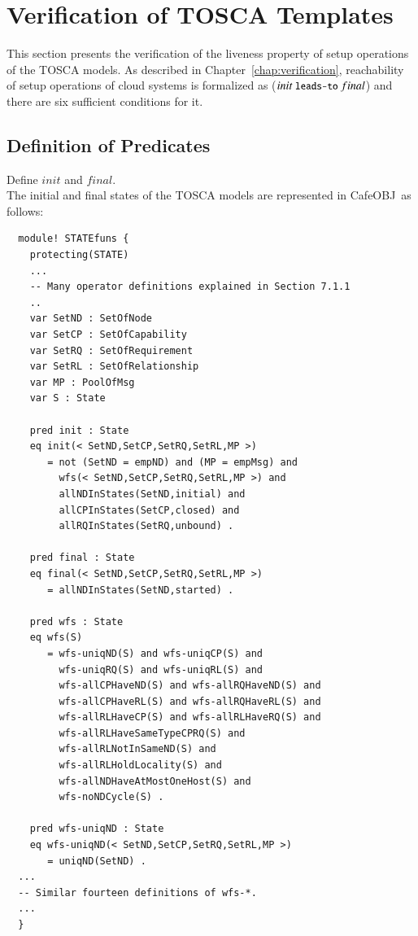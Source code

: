 \documentclass[12pt]{report}
\newcommand{\mbstt}[1]{\mbox{\small{\tt {#1}}}}
\newcommand{\cafeobj}{{\sf CafeOBJ}~}
\begin{document}
\section{Verification of TOSCA Templates}
\label{sec:TOSCAverification}
This section presents the verification of the liveness property of
setup operations of the TOSCA models. As described in
Chapter~\ref{chap:verification}, reachability of setup operations of
cloud systems is formalized as ($init~\mbstt{leads-to}~final$) and
there are six sufficient conditions for it.

\subsection{Definition of Predicates}
\label{sec:TOSCAsupport}
 Define $init$ and $final$. \\
The initial and final states of the TOSCA models are represented in
\cafeobj as follows:
\small
\begin{verbatim}
  module! STATEfuns {
    protecting(STATE)
    ...
    -- Many operator definitions explained in Section 7.1.1
    ..
    var SetND : SetOfNode
    var SetCP : SetOfCapability
    var SetRQ : SetOfRequirement
    var SetRL : SetOfRelationship
    var MP : PoolOfMsg
    var S : State
  
    pred init : State
    eq init(< SetND,SetCP,SetRQ,SetRL,MP >)
       = not (SetND = empND) and (MP = empMsg) and
         wfs(< SetND,SetCP,SetRQ,SetRL,MP >) and
         allNDInStates(SetND,initial) and 
         allCPInStates(SetCP,closed) and 
         allRQInStates(SetRQ,unbound) .
  
    pred final : State
    eq final(< SetND,SetCP,SetRQ,SetRL,MP >)
       = allNDInStates(SetND,started) .
  
    pred wfs : State
    eq wfs(S)
       = wfs-uniqND(S) and wfs-uniqCP(S) and 
         wfs-uniqRQ(S) and wfs-uniqRL(S) and
         wfs-allCPHaveND(S) and wfs-allRQHaveND(S) and 
         wfs-allCPHaveRL(S) and wfs-allRQHaveRL(S) and 
         wfs-allRLHaveCP(S) and wfs-allRLHaveRQ(S) and 
         wfs-allRLHaveSameTypeCPRQ(S) and
         wfs-allRLNotInSameND(S) and
         wfs-allRLHoldLocality(S) and
         wfs-allNDHaveAtMostOneHost(S) and
         wfs-noNDCycle(S) .
  
    pred wfs-uniqND : State
    eq wfs-uniqND(< SetND,SetCP,SetRQ,SetRL,MP >)
       = uniqND(SetND) .
  ...
  -- Similar fourteen definitions of wfs-*.  
  ...
  }
\end{verbatim}
\normalsize
\end{document}
